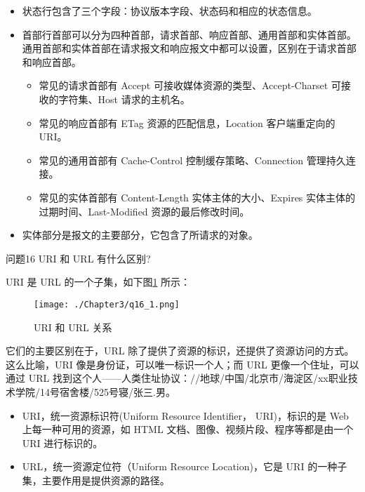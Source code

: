 \documentclass[cn,11pt,color=blue,lang=cn]{elegantbook}
\begin{document}
\begin{solution}
\begin{itemize}
	\item 状态行包含了三个字段：协议版本字段、状态码和相应的状态信息。
	\item 首部行首部可以分为四种首部，请求首部、响应首部、通用首部和实体首部。通用首部和实体首部在请求报文和响应报文中都可以设置，区别在于请求首部和响应首部。
	\begin{itemize}
		\item 常见的请求首部有 Accept 可接收媒体资源的类型、Accept-Charset 可接收的字符集、Host 请求的主机名。
		\item 常见的响应首部有 ETag 资源的匹配信息，Location 客户端重定向的 URI。
		\item 常见的通用首部有 Cache-Control 控制缓存策略、Connection 管理持久连接。
		\item 常见的实体首部有 Content-Length 实体主体的大小、Expires 实体主体的过期时间、Last-Modified 资源的最后修改时间。
	\end{itemize}
	\item 实体部分是报文的主要部分，它包含了所请求的对象。
\end{itemize}
\end{solution}

\begin{custom}{问题16}
URI 和 URL 有什么区别?
\end{custom}

\begin{solution}
URI 是 URL 的一个子集，如下图\ref{fig16_1} 所示：
\begin{figure}[htbp]
\centering
\texttt{[image: ./Chapter3/q16\_1.png]}
\caption{URI 和 URL 关系}
\label{fig16_1}
\end{figure}

它们的主要区别在于，URL 除了提供了资源的标识，还提供了资源访问的方式。这么比喻，URI 像是身份证，可以唯一标识一个人；而 URL 更像一个住址，可以通过 URL 找到这个人——人类住址协议：//地球/中国/北京市/海淀区/xx职业技术学院/14号宿舍楼/525号寝/张三.男。
\begin{itemize}
	\item URI，统一资源标识符(Uniform Resource Identifier， URI)，标识的是 Web 上每一种可用的资源，如 HTML 文档、图像、视频片段、程序等都是由一个 URI 进行标识的。
	\item URL，统一资源定位符（Uniform Resource Location)，它是 URI 的一种子集，主要作用是提供资源的路径。
\end{itemize}
\end{solution}
\end{document}
